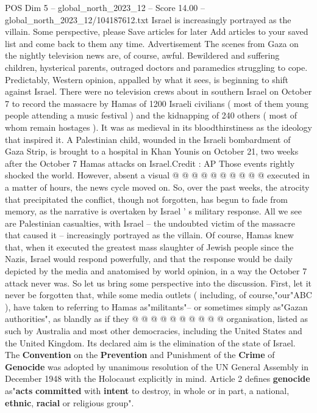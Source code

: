 \begin{textsample}{POS Dim 5 – global\_north\_2023\_12 – Score 14.00 – global\_north\_2023\_12/104187612.txt}  \label{ex:f5_pos_398}
Israel is increasingly portrayed as the villain.
Some perspective, please Save articles for later Add articles to your saved list and come back to them any time.
Advertisement The scenes from Gaza on the nightly television news are, of course, awful.
Bewildered and suffering children, hysterical parents, outraged doctors and paramedics struggling to cope.
Predictably, Western opinion, appalled by what it sees, is beginning to shift against Israel.
There were no television crews about in southern Israel on October 7 to record the massacre by Hamas of 1200 Israeli civilians ( most of them young people attending a music festival ) and the kidnapping of 240 others ( most of whom remain hostages ).
It was as medieval in its bloodthirstiness as the ideology that inspired it.
A Palestinian child, wounded in the Israeli bombardment of Gaza Strip, is brought to a hospital in Khan Younis on October 21, two weeks after the October 7 Hamas attacks on Israel.Credit : AP Those events rightly shocked the world.
However, absent a visual @ @ @ @ @ @ @ @ @ @ executed in a matter of hours, the news cycle moved on.
So, over the past weeks, the atrocity that precipitated the conflict, though not forgotten, has begun to fade from memory, as the narrative is overtaken by Israel ' s military response.
All we see are Palestinian casualties, with Israel -- the undoubted victim of the massacre that caused it -- increasingly portrayed as the villain.
Of course, Hamas knew that, when it executed the greatest mass slaughter of Jewish people since the Nazis, Israel would respond powerfully, and that the response would be daily depicted by the media and anatomised by world opinion, in a way the October 7 attack never was.
So let us bring some perspective into the discussion.
First, let it never be forgotten that, while some media outlets ( including, of course,"our"ABC ), have taken to referring to Hamas as"militants"-- or sometimes simply as"Gazan authorities", as blandly as if they @ @ @ @ @ @ @ @ @ @ organisation, listed as such by Australia and most other democracies, including the United States and the United Kingdom.
Its declared aim is the elimination of the state of Israel.
The \textbf{Convention} on the \textbf{Prevention} and Punishment of the \textbf{Crime} of \textbf{Genocide} was adopted by unanimous resolution of the UN General Assembly in December 1948 with the Holocaust explicitly in mind.
Article 2 defines \textbf{genocide} as"\textbf{acts} \textbf{committed} with \textbf{intent} to destroy, in whole or in part, a national, \textbf{ethnic}, \textbf{racial} or religious group".

\end{textsample}
